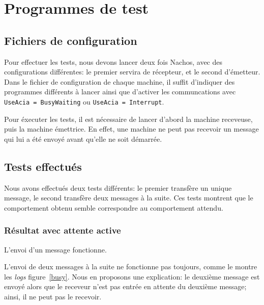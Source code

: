 \documentclass{article}
\begin{document}
\section{Programmes de test}
\subsection{Fichiers de configuration}
Pour effectuer les tests, nous devons lancer deux fois Nachos, avec des configurations différentes: le premier servira de récepteur, et le second d'émetteur. Dans le fichier de configuration de chaque machine, il suffit d'indiquer des programmes différents à lancer ainsi que d'activer les communcations avec \texttt{UseAcia = BusyWaiting} ou \texttt{UseAcia = Interrupt}.

Pour éxecuter les tests, il est nécessaire de lancer d'abord la machine receveuse, puis la machine émettrice. En effet, une machine ne peut pas recevoir un message qui lui a été envoyé avant qu'elle ne soit démarrée.

\subsection{Tests effectués}
Nous avons effectués deux tests différents: le premier transfère un unique message, le second transfère deux messages à la suite. Ces tests montrent que le comportement obtenu semble correspondre au comportement attendu.

\subsubsection{Résultat avec attente active}
L'envoi d'un message fonctionne.

L'envoi de deux messages à la suite ne fonctionne pas toujours, comme le montre les \emph{logs} figure~\ref{busy}. Nous en proposons une explication: le deuxième message est envoyé alors que le receveur n'est pas entrée en attente du deuxième message; ainsi, il ne peut pas le recevoir.
\end{document}

